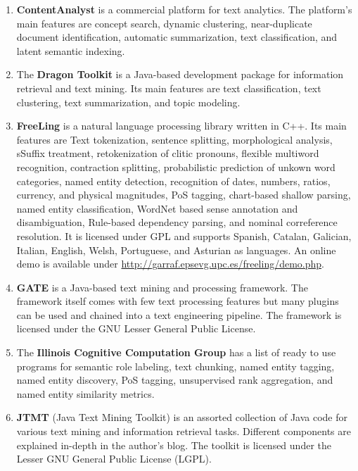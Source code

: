 \begin{enumerate}
	\item \textbf{ContentAnalyst} \cite{contentanalyst} is a commercial platform for text analytics. The platform's main features are concept search, dynamic clustering, near-duplicate document identification, automatic summarization, text classification, and latent semantic indexing.

	\item The \textbf{Dragon Toolkit} \cite{zhou2007dragon} is a Java-based development package for information retrieval and text mining. Its main features are text classification, text clustering, text summarization, and topic modeling.

	\item \textbf{FreeLing} \cite{atserias2006freeling} is a natural language processing library written in C++. Its main features are Text tokenization, sentence splitting, morphological analysis, sSuffix treatment, retokenization of clitic pronouns, flexible multiword recognition, contraction splitting, probabilistic prediction of unkown word categories, named entity detection, recognition of dates, numbers, ratios, currency, and physical magnitudes, PoS tagging, chart-based shallow parsing, named entity classification,  WordNet based sense annotation and disambiguation, Rule-based dependency parsing, and nominal correference resolution.
It is licensed under GPL and supports Spanish, Catalan, Galician, Italian, English, Welsh, Portuguese, and Asturian as languages. An online demo is available under \url{http://garraf.epsevg.upc.es/freeling/demo.php}.

	\item \textbf{GATE} \cite{cunningham2002gate} is a Java-based text mining and processing framework. The framework itself comes with few text processing features but many plugins can be used and chained into a text engineering pipeline.
The framework is licensed under the GNU Lesser General Public License.

	\item The \textbf{Illinois Cognitive Computation Group} \cite{illinoisccg} has a list of ready to use programs for semantic role labeling, text chunking, named entity tagging, named entity discovery, PoS tagging, unsupervised rank aggregation, and named entity similarity metrics.
	
	\item \textbf{JTMT} (Java Text Mining Toolkit) \cite{JTMT} is an assorted collection of Java code for various text mining and information retrieval tasks. Different components are explained in-depth in the author's blog. The toolkit is licensed under the Lesser GNU General Public License (LGPL).


\end{enumerate}
